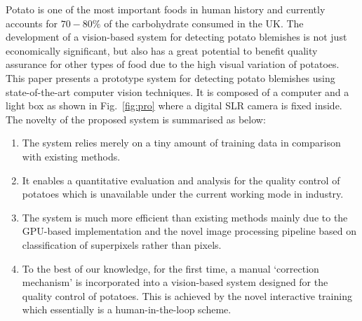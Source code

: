 \documentclass[twocolumn]{svjour3}          %
\begin{document}
Potato is one of the most important foods in human history and currently accounts for $70-80\%$ of the carbohydrate consumed in the UK. The development of a vision-based system for detecting potato blemishes is not just economically significant, but also has a great potential to benefit quality assurance for other types of food due to the high visual variation of potatoes. This paper presents a prototype system for detecting potato blemishes using state-of-the-art computer vision techniques. It is composed of a computer and a light box  as shown in Fig.~\ref{fig:pro} where a digital SLR camera is fixed inside. The novelty of the proposed system is summarised as below:

\begin{enumerate}
\item The system relies merely on a tiny amount of training data in comparison with existing methods.
\item It enables a quantitative evaluation and analysis for the quality control of potatoes which is unavailable under the current working mode in industry.
\item The system is much more efficient than existing methods mainly due to the GPU-based implementation and the novel image processing pipeline based on classification of superpixels rather than pixels.
\item To the best of our knowledge, for the first time, a manual `correction mechanism' is incorporated into a vision-based system designed for the quality control of potatoes. This is achieved by the novel interactive training which essentially is a human-in-the-loop scheme. 
\end{enumerate}
\end{document}

